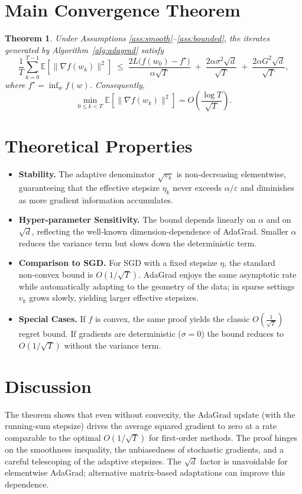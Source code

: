 \documentclass{article}
\newtheorem{theorem}{Theorem}
\newcommand{\E}{\mathbb{E}}
\newcommand{\grad}{\nabla}
\begin{document}
\vspace{0.5em}
\section*{Main Convergence Theorem}
\begin{theorem}\label{thm:main}
Under Assumptions \ref{ass:smooth}–\ref{ass:bounded}, the iterates generated by Algorithm~\ref{alg:adagrad} satisfy
\[
\frac{1}{T}\sum_{k=0}^{T-1}\E\!\left[\big\|\grad f(w_{k})\big\|^{2}\right]
\;\le\;
\frac{2L\big(f(w_{0})-f^{\star}\big)}{\alpha\sqrt{T}}
\;+\;
\frac{2\alpha\sigma^{2}\sqrt{d}}{\sqrt{T}}
\;+\;
\frac{2\alpha G^{2}\sqrt{d}}{\sqrt{T}},
\]
where $f^{\star}=\inf_{w}f(w)$. Consequently,
\[
\min_{0\le k<T}\E\!\left[\big\|\grad f(w_{k})\big\|^{2}\right]
=O\!\left(\frac{\log T}{\sqrt{T}}\right).
\]
\end{theorem}

\vspace{0.5em}
\section*{Theoretical Properties}
\begin{itemize}[leftmargin=*]
\item \textbf{Stability.} The adaptive denominator $\sqrt{v_{k}}$ is non‑decreasing elementwise, guaranteeing that the effective stepsize $\eta_{k}$ never exceeds $\alpha/\varepsilon$ and diminishes as more gradient information accumulates.
\item \textbf{Hyper‑parameter Sensitivity.} The bound depends linearly on $\alpha$ and on $\sqrt{d}$, reflecting the well‑known dimension‑dependence of AdaGrad. Smaller $\alpha$ reduces the variance term but slows down the deterministic term.
\item \textbf{Comparison to SGD.} For SGD with a fixed stepsize $\eta$, the standard non‑convex bound is $O(1/\sqrt{T})$. AdaGrad enjoys the same asymptotic rate while automatically adapting to the geometry of the data; in sparse settings $v_{k}$ grows slowly, yielding larger effective stepsizes.
\item \textbf{Special Cases.} If $f$ is convex, the same proof yields the classic $O(\frac{1}{\sqrt{T}})$ regret bound. If gradients are deterministic ($\sigma=0$) the bound reduces to $O(1/\sqrt{T})$ without the variance term.
\end{itemize}

\vspace{0.5em}
\section*{Discussion}
The theorem shows that even without convexity, the AdaGrad update (with the running‑sum stepsize) drives the average squared gradient to zero at a rate comparable to the optimal $O(1/\sqrt{T})$ for first‑order methods. The proof hinges on the smoothness inequality, the unbiasedness of stochastic gradients, and a careful telescoping of the adaptive stepsizes. The $\sqrt{d}$ factor is unavoidable for elementwise AdaGrad; alternative matrix‑based adaptations can improve this dependence.
\end{document}
